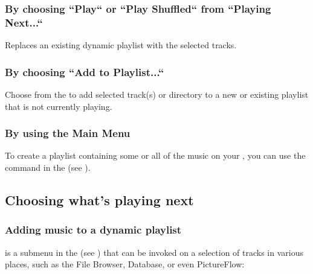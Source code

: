 \subsubsection{By choosing ``Play`` or ``Play Shuffled`` from ``Playing Next...``}
Replaces an existing dynamic playlist with the selected tracks.

\subsubsection{\label{ref:addtoplaylist_submenu}By choosing  ``Add to Playlist...``}
Choose  from the  to
add selected track(s) or directory to a new or existing playlist that is not currently
playing.


\subsubsection{By using the Main Menu}
To create a playlist containing some or all of the music on your \dap{}, you can use the
 command in the 
(see ).

\subsection{Choosing what's playing next}

\subsubsection{\label{ref:playingnext_submenu}Adding music to a dynamic playlist}
 is a submenu in the  (see
) that can be invoked on a selection of tracks in various
places, such as the File Browser, Database, or even PictureFlow:

